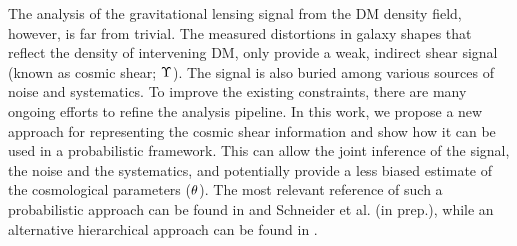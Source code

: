 The analysis of the gravitational lensing signal from the DM density field, however, is far from trivial. 
The measured distortions in galaxy shapes that reflect the density of intervening DM, 
only provide a weak, indirect shear signal (known as cosmic
shear; $\Upsilon$). The signal is also buried among various sources of noise
and systematics. 
To improve the existing constraints, there are many ongoing 
efforts to refine the analysis pipeline. 
In this work, we propose a new approach for representing 
the cosmic shear information and show how it can be used in a probabilistic framework. 
This can allow the joint inference of the signal, the noise and the systematics, 
and potentially provide a less biased estimate of the cosmological parameters 
(${\bf \theta}$). 
The most relevant reference of such a probabilistic approach can be found in 
\cite{Schneider2014} and Schneider et al. (in prep.), 
while an alternative hierarchical approach can be found in \cite{Alsing2015}. 


